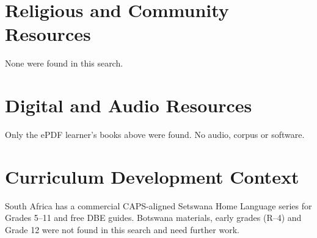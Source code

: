 \documentclass[12pt]{article}
\begin{document}
\section{Religious and Community Resources}
None were found in this search.

\section{Digital and Audio Resources}
Only the ePDF learner's books above were found. No audio, corpus or software.

\section{Curriculum Development Context}
South Africa has a commercial CAPS-aligned Setswana Home Language series for Grades 5--11 and free DBE guides. Botswana materials, early grades (R--4) and Grade 12 were not found in this search and need further work.
\end{document}
